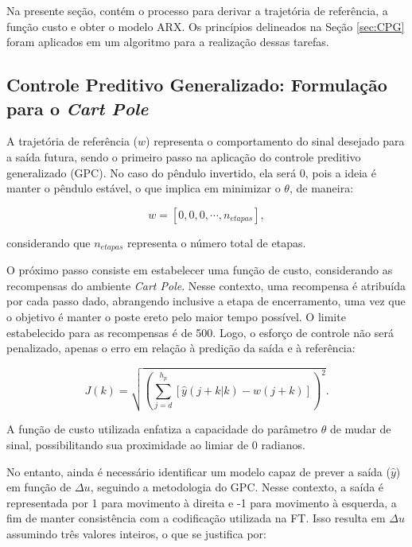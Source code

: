 \documentclass[12pt,           %
a4paper,                       %
openany,                       %
oneside,                       %
chapter=TITLE,                 %
english,                       %
spanish,                       %
brazil,                        %
sumario=tradicional]{abntex2}  %
\begin{document}
\begin{OnehalfSpace}
Na presente seção, contém o processo para derivar a trajetória de referência, a função custo e obter o modelo ARX. Os princípios delineados na Seção \ref{sec:CPG} foram aplicados em um algoritmo para a realização dessas tarefas.

\subsection{Controle Preditivo Generalizado: Formulação para o \textit{Cart Pole}}
\label{subsec:GPCfor}  

A trajetória de referência ($w$) representa o comportamento do sinal desejado para a saída futura, sendo o primeiro passo na aplicação do controle preditivo generalizado (GPC). No caso do pêndulo invertido, ela será 0, pois a ideia é manter o pêndulo estável, o que implica em minimizar o $\theta$, de maneira:

\begin{equation}
    w = [0, 0, 0, \cdots, n_{etapas}],
    \label{eq:traref}
\end{equation}

\noindent considerando que $n_{etapas}$ representa o número total de etapas.

O próximo passo consiste em estabelecer uma função de custo, considerando as recompensas do ambiente \textit{Cart Pole}. Nesse contexto, uma recompensa é atribuída por cada passo dado, abrangendo inclusive a etapa de encerramento, uma vez que o objetivo é manter o poste ereto pelo maior tempo possível. O limite estabelecido para as recompensas é de 500\cite{gymcartpole}. Logo, o esforço de controle não será penalizado, apenas o erro em relação à predição da saída e à referência:

\begin{equation}
    J(k) =\sqrt{(\sum_{j=d}^{h_p} [\hat{y}(j+k|k) - w(j+k)])^2}.
    \label{eq:FO}
\end{equation}

A função de custo utilizada enfatiza a capacidade do parâmetro $\theta$ de mudar de sinal, possibilitando sua proximidade ao limiar de 0 radianos.

No entanto, ainda é necessário identificar um modelo capaz de prever a saída ($\hat{y}$) em função de $\Delta u$, seguindo a metodologia do GPC. Nesse contexto, a saída é representada por 1 para movimento à direita e -1 para movimento à esquerda, a fim de manter consistência com a codificação utilizada na FT.  Isso resulta em $\Delta u$ assumindo três valores inteiros, o que se justifica por:


\end{OnehalfSpace}
\end{document}
